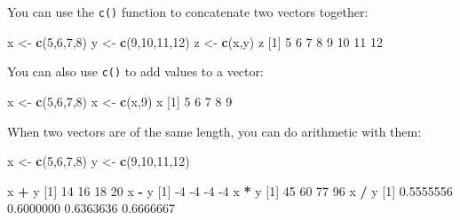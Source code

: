 \documentclass[
]{book}
\newenvironment{Shaded}{\begin{snugshade}}{\end{snugshade}}
\newcommand{\DecValTok}[1]{\textcolor[rgb]{0.00,0.00,0.81}{#1}}
\newcommand{\FloatTok}[1]{\textcolor[rgb]{0.00,0.00,0.81}{#1}}
\newcommand{\KeywordTok}[1]{\textcolor[rgb]{0.13,0.29,0.53}{\textbf{#1}}}
\newcommand{\NormalTok}[1]{#1}
\newcommand{\OperatorTok}[1]{\textcolor[rgb]{0.81,0.36,0.00}{\textbf{#1}}}
\newcommand{\StringTok}[1]{\textcolor[rgb]{0.31,0.60,0.02}{#1}}
\begin{document}
You can use the \texttt{c()} function to concatenate two vectors together:

\begin{Shaded}
\begin{Highlighting}[]
\NormalTok{x <-}\StringTok{ }\KeywordTok{c}\NormalTok{(}\DecValTok{5}\NormalTok{,}\DecValTok{6}\NormalTok{,}\DecValTok{7}\NormalTok{,}\DecValTok{8}\NormalTok{)}
\NormalTok{y <-}\StringTok{ }\KeywordTok{c}\NormalTok{(}\DecValTok{9}\NormalTok{,}\DecValTok{10}\NormalTok{,}\DecValTok{11}\NormalTok{,}\DecValTok{12}\NormalTok{)}
\NormalTok{z <-}\StringTok{ }\KeywordTok{c}\NormalTok{(x,y)}
\NormalTok{z}
\NormalTok{[}\DecValTok{1}\NormalTok{]  }\DecValTok{5}  \DecValTok{6}  \DecValTok{7}  \DecValTok{8}  \DecValTok{9} \DecValTok{10} \DecValTok{11} \DecValTok{12}
\end{Highlighting}
\end{Shaded}

You can also use \texttt{c()} to add values to a vector:

\begin{Shaded}
\begin{Highlighting}[]
\NormalTok{x <-}\StringTok{ }\KeywordTok{c}\NormalTok{(}\DecValTok{5}\NormalTok{,}\DecValTok{6}\NormalTok{,}\DecValTok{7}\NormalTok{,}\DecValTok{8}\NormalTok{)}
\NormalTok{x <-}\StringTok{ }\KeywordTok{c}\NormalTok{(x,}\DecValTok{9}\NormalTok{)}
\NormalTok{x}
\NormalTok{[}\DecValTok{1}\NormalTok{] }\DecValTok{5} \DecValTok{6} \DecValTok{7} \DecValTok{8} \DecValTok{9}
\end{Highlighting}
\end{Shaded}

When two vectors are of the same length, you can do arithmetic with them:

\begin{Shaded}
\begin{Highlighting}[]
\NormalTok{x <-}\StringTok{ }\KeywordTok{c}\NormalTok{(}\DecValTok{5}\NormalTok{,}\DecValTok{6}\NormalTok{,}\DecValTok{7}\NormalTok{,}\DecValTok{8}\NormalTok{)}
\NormalTok{y <-}\StringTok{ }\KeywordTok{c}\NormalTok{(}\DecValTok{9}\NormalTok{,}\DecValTok{10}\NormalTok{,}\DecValTok{11}\NormalTok{,}\DecValTok{12}\NormalTok{)}

\NormalTok{x }\OperatorTok{+}\StringTok{ }\NormalTok{y}
\NormalTok{[}\DecValTok{1}\NormalTok{] }\DecValTok{14} \DecValTok{16} \DecValTok{18} \DecValTok{20}
\NormalTok{x }\OperatorTok{-}\StringTok{ }\NormalTok{y}
\NormalTok{[}\DecValTok{1}\NormalTok{] }\DecValTok{-4} \DecValTok{-4} \DecValTok{-4} \DecValTok{-4}
\NormalTok{x }\OperatorTok{*}\StringTok{ }\NormalTok{y}
\NormalTok{[}\DecValTok{1}\NormalTok{] }\DecValTok{45} \DecValTok{60} \DecValTok{77} \DecValTok{96}
\NormalTok{x }\OperatorTok{/}\StringTok{ }\NormalTok{y}
\NormalTok{[}\DecValTok{1}\NormalTok{] }\FloatTok{0.5555556} \FloatTok{0.6000000} \FloatTok{0.6363636} \FloatTok{0.6666667}
\end{Highlighting}
\end{Shaded}
\end{document}
